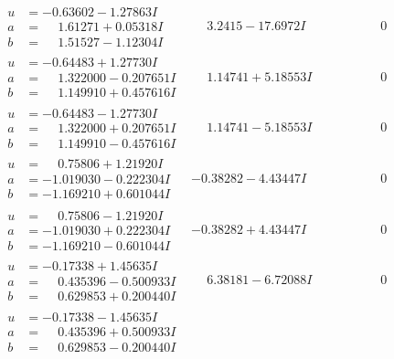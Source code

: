 \documentclass[1p]{elsarticle_modified}
\theoremstyle{definition}
\begin{document}
$$\begin{array}{c|c|c}
\begin{aligned}
u &= -0.63602 - 1.27863 I \\
a &= \phantom{-}1.61271 + 0.05318 I \\
b &= \phantom{-}1.51527 - 1.12304 I\end{aligned}
 & \phantom{-}3.2415 - 17.6972 I & \phantom{-0.000000 } 0 \\ \hline\begin{aligned}
u &= -0.64483 + 1.27730 I \\
a &= \phantom{-}1.322000 - 0.207651 I \\
b &= \phantom{-}1.149910 + 0.457616 I\end{aligned}
 & \phantom{-}1.14741 + 5.18553 I & \phantom{-0.000000 } 0 \\ \hline\begin{aligned}
u &= -0.64483 - 1.27730 I \\
a &= \phantom{-}1.322000 + 0.207651 I \\
b &= \phantom{-}1.149910 - 0.457616 I\end{aligned}
 & \phantom{-}1.14741 - 5.18553 I & \phantom{-0.000000 } 0 \\ \hline\begin{aligned}
u &= \phantom{-}0.75806 + 1.21920 I \\
a &= -1.019030 - 0.222304 I \\
b &= -1.169210 + 0.601044 I\end{aligned}
 & -0.38282 - 4.43447 I & \phantom{-0.000000 } 0 \\ \hline\begin{aligned}
u &= \phantom{-}0.75806 - 1.21920 I \\
a &= -1.019030 + 0.222304 I \\
b &= -1.169210 - 0.601044 I\end{aligned}
 & -0.38282 + 4.43447 I & \phantom{-0.000000 } 0 \\ \hline\begin{aligned}
u &= -0.17338 + 1.45635 I \\
a &= \phantom{-}0.435396 - 0.500933 I \\
b &= \phantom{-}0.629853 + 0.200440 I\end{aligned}
 & \phantom{-}6.38181 - 6.72088 I & \phantom{-0.000000 } 0 \\ \hline\begin{aligned}
u &= -0.17338 - 1.45635 I \\
a &= \phantom{-}0.435396 + 0.500933 I \\
b &= \phantom{-}0.629853 - 0.200440 I\end{aligned}

\end{array}$$
\end{document}

